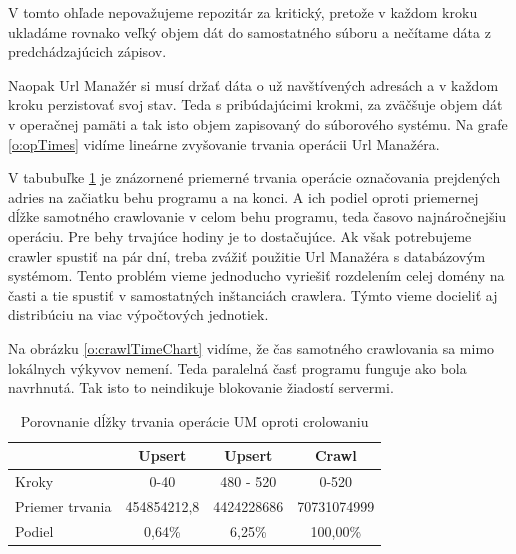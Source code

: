 V tomto ohľade nepovažujeme repozitár za kritický, pretože v každom kroku ukladáme rovnako veľký objem dát do samostatného súboru a nečítame dáta z predchádzajúcich zápisov.

Naopak Url Manažér si musí držať dáta o už navštívených adresách a v každom kroku perzistovať svoj stav. Teda s pribúdajúcimi krokmi, za zväčšuje objem dát v operačnej pamäti a tak isto objem zapisovaný do súborového systému. Na grafe \ref{o:opTimes} vidíme lineárne zvyšovanie trvania operácii Url Manažéra. 

V tabubuľke \ref{t:degr} je znázornené priemerné trvania operácie označovania prejdených adries na začiatku behu programu a na konci. A ich podiel oproti priemernej dĺžke samotného crawlovanie v celom behu programu, teda časovo najnáročnejšiu operáciu. Pre behy trvajúce hodiny je to dostačujúce. Ak však potrebujeme crawler spustiť na pár dní, treba zvážiť použitie Url Manažéra s databázovým systémom. Tento problém vieme jednoducho vyriešiť rozdelením celej domény na časti a tie spustiť v samostatných inštanciách crawlera. Týmto vieme docieliť aj distribúciu na viac výpočtových jednotiek. 

Na obrázku \ref{o:crawlTimeChart} vidíme, že čas samotného crawlovania sa mimo lokálnych výkyvov nemení. Teda paralelná časť programu funguje ako bola navrhnutá. Tak isto to neindikuje blokovanie žiadostí servermi. 


\begin{table}[!ht]
	\caption{Porovnanie dĺžky trvania operácie UM oproti crolowaniu}\label{t:degr}
	\smallskip
	\centering
    \begin{tabular}{|l|c|c|c|}
    \hline
          & Upsert & Upsert & Crawl \\ \hline
        Kroky & 0-40 & 480 - 520 & 0-520 \\ \hline
        Priemer trvania & 454854212,8 & 4424228686 & 70731074999 \\ \hline
        Podiel & 0,64\% & 6,25\% & 100,00\% \\ \hline
    \end{tabular}
\end{table}


